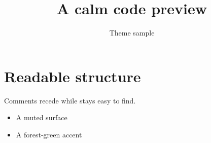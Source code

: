 \documentclass{preview}
\title{A calm code preview}
\author{Theme sample}
\begin{document}
\maketitle

\section{Readable structure}
Comments recede while  stays easy to find.

\begin{itemize}
  \item A muted surface
  \item A forest-green accent
\end{itemize}
\end{document}
